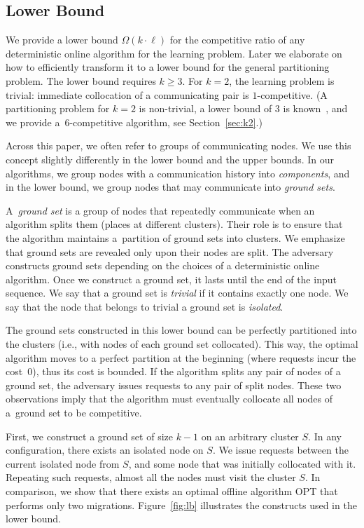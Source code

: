 \documentclass[a4paper,anonymous,USenglish]{lipics-v2019}
\newcommand{\OPT}{\textsc{OPT}\xspace}
\begin{document}
\subsection{Lower Bound}

\label{sec:lowerbound}


We provide a lower bound $\Omega(k\cdot \ell)$ for the competitive ratio of any deterministic online algorithm for the learning problem.
Later we elaborate on how to efficiently transform it to a lower bound for the general partitioning problem.
The lower bound requires $k\geq 3$.
For $k=2$, the learning problem is trivial: immediate collocation of a communicating pair is $1$-competitive.
(A partitioning problem for $k=2$ is non-trivial, a lower bound of $3$ is known~\cite{repartition-disc}, and we provide a~$6$-competitive algorithm, see Section~\ref{sec:k2}.)

Across this paper, we often refer to groups of communicating nodes.
We use this concept slightly differently in the lower bound and the upper bounds.
In our algorithms, we group nodes with a communication history into \emph{components}, and in the lower bound, we group nodes that may communicate into \emph{ground sets}.

A~\emph{ground set} is a group of nodes that repeatedly communicate when an algorithm splits them (places at different clusters).
Their role is to ensure that the algorithm maintains a~partition of ground sets into clusters.
We emphasize that ground sets are revealed only upon their nodes are split.
The adversary constructs ground sets depending on the choices of a deterministic online algorithm.
Once we construct a ground set, it lasts until the end of the input sequence.
We say that a ground set is \emph{trivial} if it contains exactly one node.
We say that the node that belongs to trivial a ground set is \emph{isolated}.

The ground sets constructed in this lower bound can be perfectly partitioned into the clusters (i.e., with nodes of each ground set collocated).
This way, the optimal algorithm moves to a perfect partition at the beginning (where requests incur the cost~$0$), thus its cost is bounded.
If the algorithm splits any pair of nodes of a ground set, the adversary issues requests to any pair of split nodes.
These two observations imply that the algorithm must eventually collocate all nodes of a~ground set to be competitive.

First, we construct a ground set of size $k-1$ on an arbitrary cluster $S$.
In any configuration, there exists an isolated node on $S$.
We issue requests between the current isolated node from $S$, and some node that was initially collocated with it.
Repeating such requests, almost all the nodes must visit the cluster $S$.
In comparison, we show that there exists an optimal offline algorithm \OPT that performs only two migrations.
Figure~\ref{fig:lb} illustrates the constructs used in the lower bound.
\end{document}
